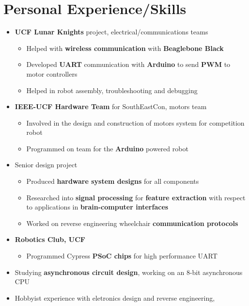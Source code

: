 \documentclass{my_resume}
\begin{document}
\section{Personal Experience/Skills}
\begin{itemize}
    \item \textbf{UCF Lunar Knights} project, electrical/communications teams
        \begin{itemize}
            \item Helped with \textbf{wireless communication} with
                \textbf{Beaglebone Black}
            \item Developed \textbf{UART} communication with \textbf{Arduino} to send
                \textbf{PWM} to motor controllers
            \item Helped in robot assembly, troubleshooting and debugging
        \end{itemize}
    \item \textbf{IEEE-UCF Hardware Team} for SouthEastCon, motors team
        \begin{itemize}
            \item Involved in the design and construction of motors system for
                competition robot
            \item Programmed on team for the \textbf{Arduino} powered robot
        \end{itemize}
    \item Senior design project
        \begin{itemize}
            \item Produced \textbf{hardware system designs} for all components
            \item Researched into \textbf{signal processing} for \textbf{feature extraction}
                with respect to applications in \textbf{brain-computer interfaces}
            \item Worked on reverse engineering wheelchair 
                \textbf{communication protocols}
        \end{itemize}
    \item \textbf{Robotics Club, UCF}
        \begin{itemize}
            \item Programmed Cypress \textbf{PSoC chips} for high performance UART
        \end{itemize}
    \item Studying \textbf{asynchronous circuit design}, working on an 8-bit asynchronous
        CPU
    \item Hobbyist experience with eletronics design and reverse engineering, 

\end{itemize}
\end{document}
